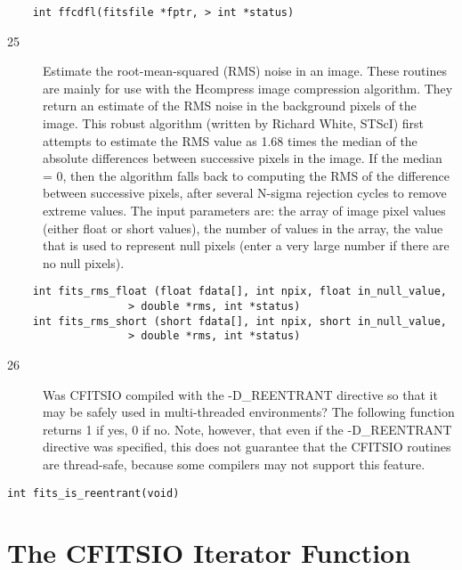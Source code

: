 \documentclass[11pt]{book}
\begin{document}
\begin{verbatim}
    int ffcdfl(fitsfile *fptr, > int *status)
\end{verbatim}

\begin{description}
\item[25]  Estimate the root-mean-squared (RMS) noise in an image.
These routines are mainly for use with the Hcompress image compression
algorithm.  They return an estimate of the RMS noise in the background
pixels of the image.  This robust algorithm (written by Richard
White, STScI) first attempts to estimate the RMS value
as 1.68 times the median of the absolute differences between successive
pixels in the image.  If the median = 0,  then the
algorithm falls back to computing the RMS of the difference between successive
pixels, after several N-sigma rejection cycles to remove
extreme values.  The input parameters are:  the array of image pixel values
(either float or short values), the number of values in the array,
the value that is used to represent null pixels (enter a very
large number if there are no null pixels). \label{imageRMS}
\end{description}

\begin{verbatim}
    int fits_rms_float (float fdata[], int npix, float in_null_value,
                   > double *rms, int *status)
    int fits_rms_short (short fdata[], int npix, short in_null_value,
                   > double *rms, int *status)
\end{verbatim}

\begin{description}
\item[26]  Was CFITSIO compiled with the -D\_REENTRANT directive
so that it may be safely used in multi-threaded environments?
The following function returns 1 if yes, 0 if no.  Note, however,
that even if the -D\_REENTRANT directive was specified, this does
not guarantee that the CFITSIO routines are thread-safe, because
some compilers may not support this feature.\label{reentrant}
\end{description}

\begin{verbatim}
int fits_is_reentrant(void)
\end{verbatim}

\chapter{  The CFITSIO Iterator Function }
\end{document}
